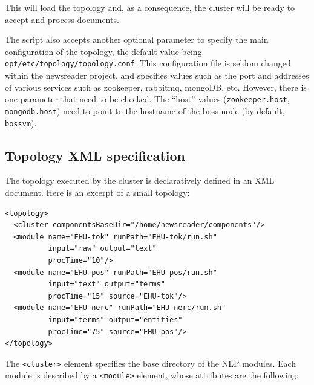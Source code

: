 \documentclass[a4]{article}
\begin{document}
This will load the topology and, as a consequence, the cluster will be ready
to accept and process documents.

The script also accepts another optional parameter to specify the main
configuration of the topology, the default value being
\texttt{opt/etc/topology/topology.conf}. This configuration file is
seldom changed within the newsreader project, and specifies values
such as the port and addresses of various services such as zookeeper,
rabbitmq, mongoDB, etc. However, there is one parameter that need to
be checked. The ``host'' values (\texttt{zookeeper.host},
\texttt{mongodb.host}) need to point to the hostname of the boss node
(by default, \texttt{bossvm}).

\subsection{Topology XML specification}
\label{sec:topol-xml-spec}

The topology executed by the cluster is declaratively defined in an XML
document. Here is an excerpt of a small topology:

\begin{lstlisting}
<topology>
  <cluster componentsBaseDir="/home/newsreader/components"/>
  <module name="EHU-tok" runPath="EHU-tok/run.sh"
          input="raw" output="text"
          procTime="10"/>
  <module name="EHU-pos" runPath="EHU-pos/run.sh"
          input="text" output="terms"
          procTime="15" source="EHU-tok"/>
  <module name="EHU-nerc" runPath="EHU-nerc/run.sh"
          input="terms" output="entities"
          procTime="75" source="EHU-pos"/>
</topology>
\end{lstlisting}

The \texttt{<cluster>} element specifies the base directory of the NLP
modules. Each module is described by a \texttt{<module>} element, whose
attributes are the following:
\end{document}
